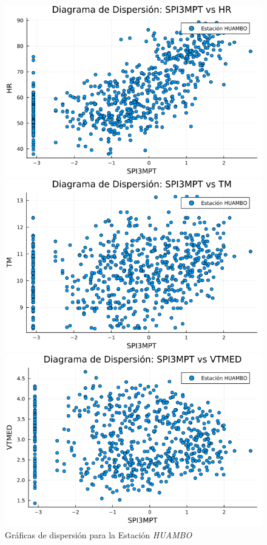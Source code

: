 \begin{figure}[htbp]
\centering
\caption{Gráficas de dispersión para la Estación \textit{HUAMBO}}
\begin{minipage}{0.32\textwidth}
    \centering
    \includegraphics[width=\linewidth]{Capitulos/Scaterplot/HUAMBO_SPI3MPT_vs_HR.png}
\end{minipage}\hfill
\begin{minipage}{0.32\textwidth}
    \centering
    \includegraphics[width=\linewidth]{Capitulos/Scaterplot/HUAMBO_SPI3MPT_vs_TM.png}
\end{minipage}\hfill
\begin{minipage}{0.32\textwidth}
    \centering
    \includegraphics[width=\linewidth]{Capitulos/Scaterplot/HUAMBO_SPI3MPT_vs_VTMED.png}

\end{minipage}
\end{figure}
